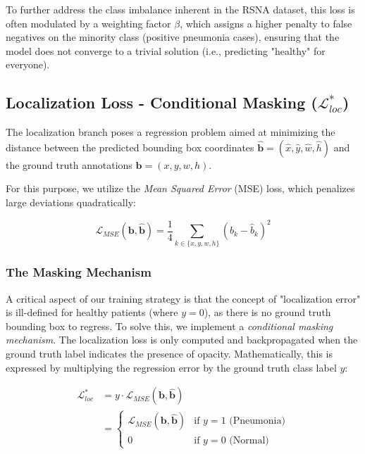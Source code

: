 \documentclass[a4paper,fleqn]{cas-dc}
\begin{document}
To further address the class imbalance inherent in the RSNA dataset, this loss is often modulated by a weighting factor $\beta$, which assigns a higher penalty to false negatives on the minority class (positive pneumonia cases), ensuring that the model does not converge to a trivial solution (i.e., predicting "healthy" for everyone).

\subsection{Localization Loss - Conditional Masking ($\mathcal{L}_{loc}^*$)}
The localization branch poses a regression problem aimed at minimizing the distance between the predicted bounding box coordinates $\hat{\mathbf{b}} = (\hat{x}, \hat{y}, \hat{w}, \hat{h})$ and the ground truth annotations $\mathbf{b} = (x, y, w, h)$.

For this purpose, we utilize the \textit{Mean Squared Error} (MSE) loss, which penalizes large deviations quadratically:

\begin{equation}
	\mathcal{L}_{MSE}(\mathbf{b}, \hat{\mathbf{b}}) = \frac{1}{4} \sum_{k \in \{x,y,w,h\}} (b_k - \hat{b}_k)^2
\end{equation}

\subsubsection{The Masking Mechanism}
A critical aspect of our training strategy is that the concept of "localization error" is ill-defined for healthy patients (where $y=0$), as there is no ground truth bounding box to regress.
To solve this, we implement a \textit{conditional masking mechanism}. The localization loss is only computed and backpropagated when the ground truth label indicates the presence of opacity. Mathematically, this is expressed by multiplying the regression error by the ground truth class label $y$:

\begin{equation}
	\begin{split}
		\mathcal{L}_{loc}^* &= y \cdot \mathcal{L}_{MSE}(\mathbf{b}, \hat{\mathbf{b}}) \\
		&= \begin{cases} 
			\mathcal{L}_{MSE}(\mathbf{b}, \hat{\mathbf{b}}) & \text{if } y = 1 \text{ (Pneumonia)} \\
			0 & \text{if } y = 0 \text{ (Normal)}
		\end{cases}
	\end{split}
\end{equation}
\end{document}
